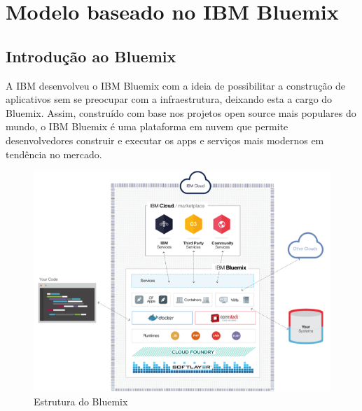 




\section{Modelo baseado no IBM Bluemix}

\subsection{Introdução ao Bluemix}

A IBM desenvolveu o IBM Bluemix com a ideia de possibilitar a construção de aplicativos sem se preocupar com a infraestrutura, deixando esta a cargo do Bluemix. Assim, construído com base nos projetos open source mais populares do mundo, o IBM Bluemix é uma plataforma em nuvem que permite desenvolvedores construir e executar os apps e serviços mais modernos em tendência no mercado.

\begin{figure}[!htb]
  \centering
  \includegraphics{imagens/estrutura}
  \caption{Estrutura do Bluemix}
  \label{Rotulo}
\end{figure}

